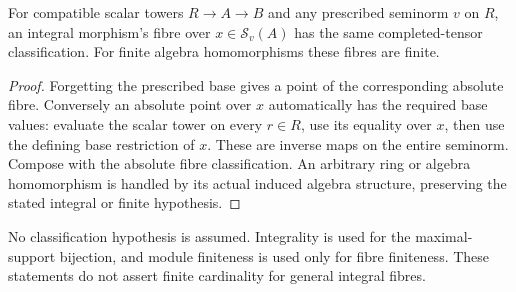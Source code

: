 \begin{corollary}
\label{spectrum:relative-integral-completed-fibres}
\leanok
{}
For compatible scalar towers $R\to A\to B$ and any prescribed
seminorm $v$ on $R$, an integral morphism's fibre over
$x\in\mathcal S_v(A)$ has the same completed-tensor classification.
For finite algebra homomorphisms these fibres are finite.
\end{corollary}
\begin{proof}
Forgetting the prescribed base gives a point of the corresponding
absolute fibre. Conversely an absolute point over $x$ automatically
has the required base values: evaluate the scalar tower on every
$r\in R$, use its equality over $x$, then use the defining base
restriction of $x$. These are inverse maps on the entire seminorm.
Compose with the absolute fibre classification. An arbitrary ring
or algebra homomorphism is handled by its actual induced algebra
structure, preserving the stated integral or finite hypothesis.
\end{proof}

No classification hypothesis is assumed. Integrality is used for
the maximal-support bijection, and module finiteness is used only
for fibre finiteness. These statements do not assert finite
cardinality for general integral fibres.
